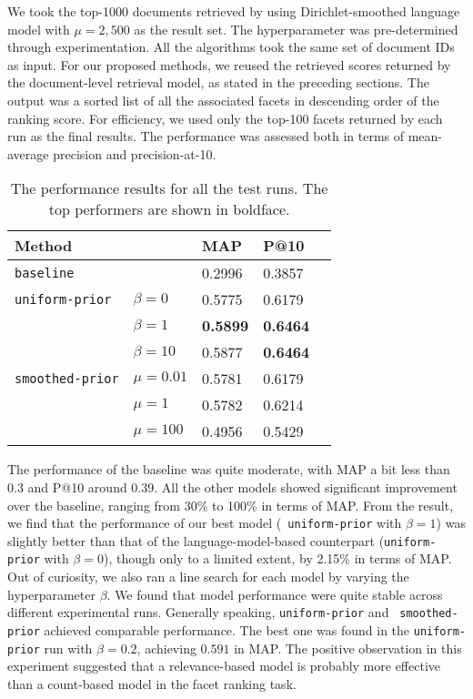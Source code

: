 We took the top-1000 documents retrieved by using Dirichlet-smoothed language
model with $\mu = 2,500$ as the result set.  The hyperparameter was
pre-determined through experimentation.  All the algorithms took the same set
of document IDs as input.  For our proposed methods, we reused the retrieved
scores returned by the document-level retrieval model, as stated in the
preceding sections.  The output was a sorted list of all the associated facets
in descending order of the ranking score.  For efficiency, we used only the
top-100 facets returned by each run as the final results.  The performance was
assessed both in terms of mean-average precision and precision-at-10.

\begin{table}[ht!]
  \caption{The performance results for all the test runs.  The top performers are
  shown in boldface.} \label{t:performance}
  \centering
  \begin{tabular}{lllll}
    Method & & MAP & P@10 & \\
    \hline
    {\tt baseline} & & 0.2996 & 0.3857 & \\
    {\tt uniform-prior} & $\beta = 0$ & 0.5775 & 0.6179 & \\
    & $\beta = 1$ & {\bf 0.5899} & {\bf 0.6464} & \\
    & $\beta = 10$ & 0.5877 & {\bf 0.6464} & \\
    {\tt smoothed-prior} & $\mu = 0.01$ & 0.5781 & 0.6179 &\\
    & $\mu = 1$ & 0.5782 & 0.6214 & \\
    & $\mu = 100$ & 0.4956 & 0.5429 &
  \end{tabular}
\end{table}

The performance of the baseline was quite moderate, with MAP a bit less
than 0.3 and P@10 around 0.39.  All the other models showed significant
improvement over the baseline, ranging from 30\% to 100\% in terms of MAP.
From the result, we find that the performance of our best model ({\tt
uniform-prior} with $\beta = 1$) was slightly better than that of the
language-model-based counterpart ({\tt uniform-prior}
with $\beta = 0$), though only to a limited extent, by 2.15\% in terms of MAP.
Out of curiosity, we also ran a line search for each model by varying the
hyperparameter $\beta$.  We found that model performance were quite stable
across different experimental runs.  Generally speaking, {\tt uniform-prior} and {\tt
smoothed-prior} achieved comparable performance.  The best one was found in the
{\tt uniform-prior} run with $\beta = 0.2$, achieving $0.591$ in MAP.  The
positive observation in this experiment suggested that a relevance-based
model is probably more effective than a count-based model in the
facet ranking task.  

